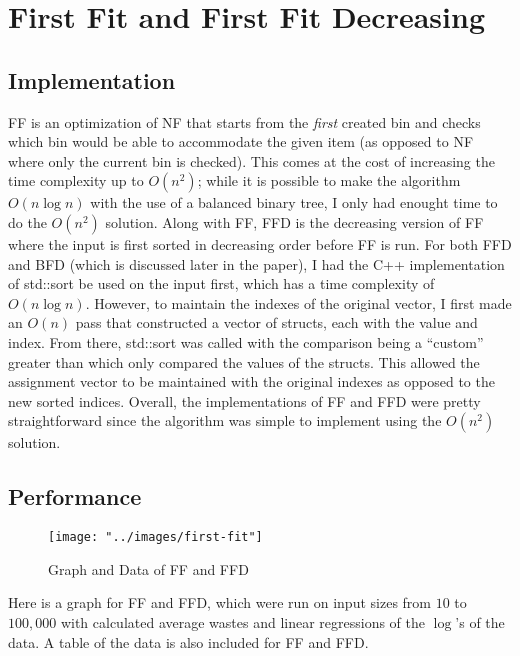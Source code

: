 \documentclass{article}
\begin{document}
\section{First Fit and First Fit Decreasing}
\subsection{Implementation}
    FF is an optimization of NF that starts from the \textit{first} created bin
    and checks which bin would be able to accommodate the given item (as 
    opposed to NF where only the current bin is checked). This comes at the 
    cost of increasing the time complexity up to $O(n^2)$; while it is possible
    to make the algorithm $O(n\log{n})$ with the use of a balanced binary tree,
    I only had enought time to do the $O(n^2)$ solution.
    \nextblurb
    Along with FF, FFD is the decreasing version of FF where the input is first
    sorted in decreasing order before FF is run. For both FFD and BFD (which is
    discussed later in the paper), I had the C++ implementation of std::sort
    be used on the input first, which has a time complexity of $O(n\log{n})$.
    However, to maintain the indexes of the original vector, I first made an
    $O(n)$ pass that constructed a vector of structs, each with the value and
    index. From there, std::sort was called with the comparison being a
    ``custom'' greater than which only compared the values of the structs. This
    allowed the assignment vector to be maintained with the original indexes as
    opposed to the new sorted indices.
    \nextblurb
    Overall, the implementations of FF and FFD were pretty straightforward since
    the algorithm was simple to implement using the $O(n^2)$ solution.
\subsection{Performance}
    \begin{figure}[H]
        \centering
        \texttt{[image: "../images/first-fit"]}
        \caption{Graph and Data of FF and FFD}
    \end{figure}
    Here is a graph for FF and FFD, which were run on input sizes from $10$ to 
    $100,000$ with calculated average wastes and linear regressions of the 
    $\log$'s of the data. A table of the data is also included for FF and FFD.
\end{document}
